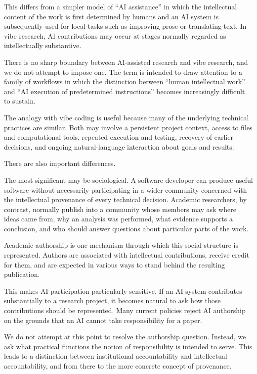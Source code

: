This differs from a simpler model of ``AI assistance'' in which the intellectual content of the work is first determined by humans and an AI system is subsequently used for local tasks such as improving prose or translating text. In vibe research, AI contributions may occur at stages normally regarded as intellectually substantive.

There is no sharp boundary between AI-assisted research and vibe research, and we do not attempt to impose one. The term is intended to draw attention to a family of workflows in which the distinction between ``human intellectual work'' and ``AI execution of predetermined instructions'' becomes increasingly difficult to sustain.

The analogy with vibe coding is useful because many of the underlying technical practices are similar. Both may involve a persistent project context, access to files and computational tools, repeated execution and testing, recovery of earlier decisions, and ongoing natural-language interaction about goals and results.

There are also important differences.

The most significant may be sociological. A software developer can produce useful software without necessarily participating in a wider community concerned with the intellectual provenance of every technical decision. Academic researchers, by contrast, normally publish into a community whose members may ask where ideas came from, why an analysis was performed, what evidence supports a conclusion, and who should answer questions about particular parts of the work.

Academic authorship is one mechanism through which this social structure is represented. Authors are associated with intellectual contributions, receive credit for them, and are expected in various ways to stand behind the resulting publication.

This makes AI participation particularly sensitive. If an AI system contributes substantially to a research project, it becomes natural to ask how those contributions should be represented. Many current policies reject AI authorship on the grounds that an AI cannot take responsibility for a paper.

We do not attempt at this point to resolve the authorship question. Instead, we ask what practical functions the notion of responsibility is intended to serve. This leads to a distinction between institutional accountability and intellectual accountability, and from there to the more concrete concept of provenance.


